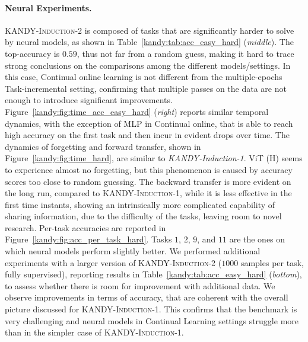 \paragraph{Neural Experiments.}
\textsc{KANDY-Induction-2} is composed of tasks that are significantly harder to solve by neural models, as shown in Table~\ref{kandy:tab:acc_easy_hard} ({\it middle}). The top-accuracy is $0.59$, thus not far from a random guess, making it hard to trace strong conclusions on the comparisons among the different models/settings. 
In this case, {\sc\small Continual online} learning is not different from the multiple-epochs {\sc\small Task-incremental} setting, confirming that multiple passes on the data are not enough to introduce significant improvements. %
Figure~\ref{kandy:fig:time_acc_easy_hard} ({\it right}) reports similar temporal dynamics, with the exception of {\sc\small MLP} in {\sc\small Continual online}, that is able to reach high accuracy on the first task and then incur in evident drops over time. 
The dynamics of forgetting and forward transfer, shown in Figure~\ref{kandy:fig:time_hard}, are similar to \textit{KANDY-Induction-1}. {\sc\small ViT (H)} seems to experience almost no forgetting, but this phenomenon is caused by accuracy scores too close to random guessing. The backward transfer is more evident on the long run, compared to \textsc{KANDY-Induction-1}, while it is less effective in the first time instants, showing an intrinsically more complicated capability of sharing information, due to the difficulty of the tasks, leaving room to novel research.
Per-task accuracies are reported in Figure~\ref{kandy:fig:acc_per_task_hard}. Tasks $1$, $2$, $9$, and $11$ are the ones on which neural models perform slightly better. %
We performed additional experiments with a larger version of \textsc{KANDY-Induction-2} ($1000$ samples per task, fully supervised), reporting results in Table~\ref{kandy:tab:acc_easy_hard} ({\it bottom}), to assess whether there is room for improvement with additional data. We observe improvements in terms of accuracy, that are coherent with the overall picture discussed for \textsc{KANDY-Induction-1}. This confirms that the benchmark is very challenging and neural models in Continual Learning settings struggle more than in the simpler case of \textsc{KANDY-Induction-1}. %

